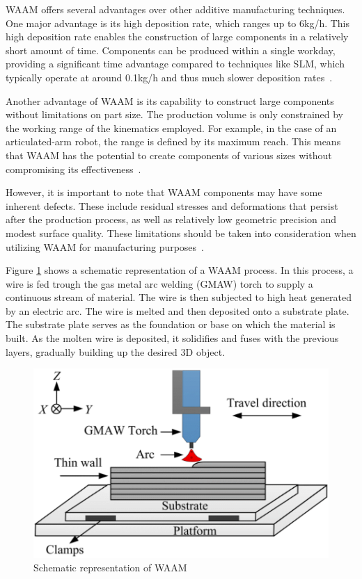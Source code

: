 WAAM offers several advantages over other additive manufacturing techniques. One major advantage is its high deposition rate, which ranges up to 6kg/h. This high deposition rate enables the construction of large components in a relatively short amount of time. Components can be produced within a single workday, providing a significant time advantage compared to techniques like SLM, which typically operate at around 0.1kg/h and thus much slower deposition rates~\cite{IvanTabernero.2018}.

Another advantage of WAAM is its capability to construct large components without limitations on part size. The production volume is only constrained by the working range of the kinematics employed. For example, in the case of an articulated-arm robot, the range is defined by its maximum reach. This means that WAAM has the potential to create components of various sizes without compromising its effectiveness~\cite{Li.2019}.

However, it is important to note that WAAM components may have some inherent defects. These include residual stresses and deformations that persist after the production process, as well as relatively low geometric precision and modest surface quality. These limitations should be taken into consideration when utilizing WAAM for manufacturing purposes~\cite{Wu.2018}.

Figure \ref{WAAM} shows a schematic representation of a WAAM process. In this process, a wire is fed trough the gas metal arc welding (GMAW) torch to supply a continuous stream of material. The wire is then subjected to high heat generated by an electric arc. The wire is melted and then deposited onto a substrate plate. The substrate plate serves as the foundation or base on which the material is built. As the molten wire is deposited, it solidifies and fuses with the previous layers, gradually building up the desired 3D object.

\begin{figure}[H]
	\centerline{\includegraphics[scale=1]{figures/WAAM.png}}
	\caption{Schematic representation of WAAM~\cite{Chaurasia.}}
	\label{WAAM}
\end{figure}

